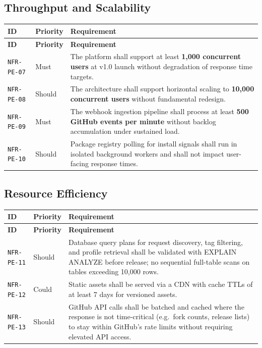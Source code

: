 \documentclass[12pt,a4paper]{article}
\begin{document}
\subsection{Throughput and Scalability}
\begin{longtable}{L{2.2cm} L{1.8cm} L{9.3cm}}
  \color{white}\bfseries ID & \color{white}\bfseries Priority & \color{white}\bfseries Requirement \\
  \endfirsthead
  \color{white}\bfseries ID & \color{white}\bfseries Priority & \color{white}\bfseries Requirement \\
  \endhead\hline
  \texttt{NFR-PE-07} & Must   & The platform shall support at least \textbf{1,000 concurrent users} at v1.0 launch without degradation of response time targets. \\
  \texttt{NFR-PE-08} & Should & The architecture shall support horizontal scaling to \textbf{10,000 concurrent users} without fundamental redesign. \\
  \texttt{NFR-PE-09} & Must   & The webhook ingestion pipeline shall process at least \textbf{500 GitHub events per minute} without backlog accumulation under sustained load. \\
  \texttt{NFR-PE-10} & Should & Package registry polling for install signals shall run in isolated background workers and shall not impact user-facing response times. \\
  \hline
\end{longtable}

\subsection{Resource Efficiency}
\begin{longtable}{L{2.2cm} L{1.8cm} L{9.3cm}}
  \color{white}\bfseries ID & \color{white}\bfseries Priority & \color{white}\bfseries Requirement \\
  \endfirsthead
  \color{white}\bfseries ID & \color{white}\bfseries Priority & \color{white}\bfseries Requirement \\
  \endhead\hline
  \texttt{NFR-PE-11} & Should & Database query plans for request discovery, tag filtering, and profile retrieval shall be validated with EXPLAIN ANALYZE before release; no sequential full-table scans on tables exceeding 10,000 rows. \\
  \texttt{NFR-PE-12} & Could  & Static assets shall be served via a CDN with cache TTLs of at least 7 days for versioned assets. \\
  \texttt{NFR-PE-13} & Should & GitHub API calls shall be batched and cached where the response is not time-critical (e.g.\ fork counts, release lists) to stay within GitHub's rate limits without requiring elevated API access. \\
  \hline
\end{longtable}
\end{document}
